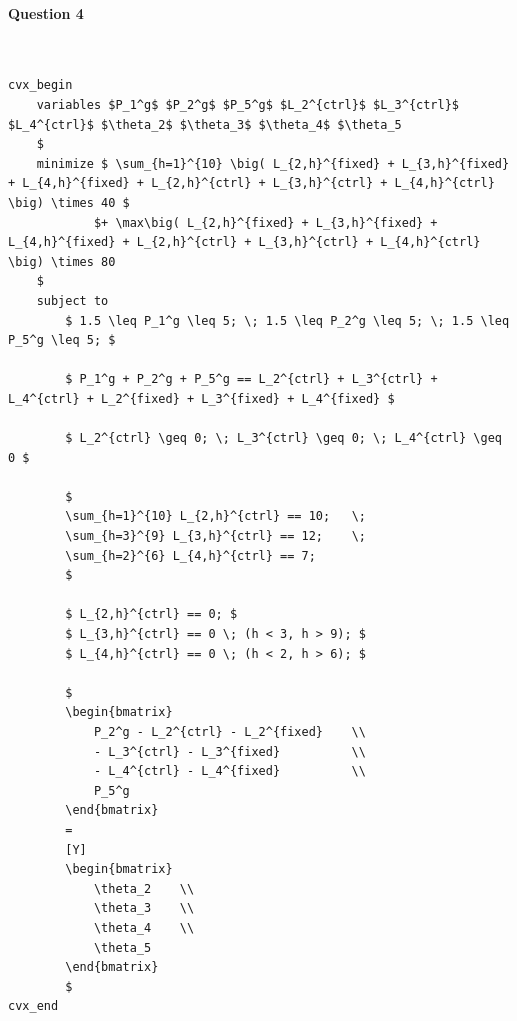 \documentclass[11pt]{article}
\begin{document}
\paragraph{Question 4} \mbox{} \\
\begin{lstlisting}
cvx_begin
    variables $P_1^g$ $P_2^g$ $P_5^g$ $L_2^{ctrl}$ $L_3^{ctrl}$ $L_4^{ctrl}$ $\theta_2$ $\theta_3$ $\theta_4$ $\theta_5
    $
    minimize $ \sum_{h=1}^{10} \big( L_{2,h}^{fixed} + L_{3,h}^{fixed} + L_{4,h}^{fixed} + L_{2,h}^{ctrl} + L_{3,h}^{ctrl} + L_{4,h}^{ctrl} \big) \times 40 $
            $+ \max\big( L_{2,h}^{fixed} + L_{3,h}^{fixed} + L_{4,h}^{fixed} + L_{2,h}^{ctrl} + L_{3,h}^{ctrl} + L_{4,h}^{ctrl} \big) \times 80
    $
    subject to
        $ 1.5 \leq P_1^g \leq 5; \; 1.5 \leq P_2^g \leq 5; \; 1.5 \leq P_5^g \leq 5; $
        
        $ P_1^g + P_2^g + P_5^g == L_2^{ctrl} + L_3^{ctrl} + L_4^{ctrl} + L_2^{fixed} + L_3^{fixed} + L_4^{fixed} $

        $ L_2^{ctrl} \geq 0; \; L_3^{ctrl} \geq 0; \; L_4^{ctrl} \geq 0 $

        $
        \sum_{h=1}^{10} L_{2,h}^{ctrl} == 10;   \;
        \sum_{h=3}^{9} L_{3,h}^{ctrl} == 12;    \;
        \sum_{h=2}^{6} L_{4,h}^{ctrl} == 7;
        $

        $ L_{2,h}^{ctrl} == 0; $
        $ L_{3,h}^{ctrl} == 0 \; (h < 3, h > 9); $
        $ L_{4,h}^{ctrl} == 0 \; (h < 2, h > 6); $
        
        $
        \begin{bmatrix}
            P_2^g - L_2^{ctrl} - L_2^{fixed}    \\
            - L_3^{ctrl} - L_3^{fixed}          \\
            - L_4^{ctrl} - L_4^{fixed}          \\
            P_5^g                       
        \end{bmatrix}
        =
        [Y]
        \begin{bmatrix}
            \theta_2    \\
            \theta_3    \\
            \theta_4    \\
            \theta_5
        \end{bmatrix}
        $
cvx_end
\end{lstlisting}
\end{document}
